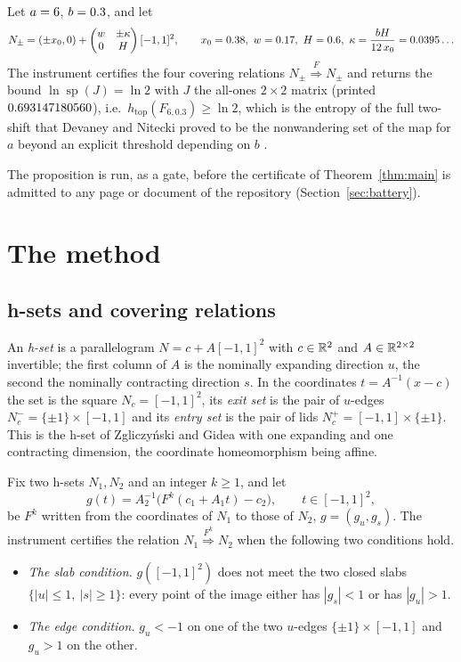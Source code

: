 \documentclass[11pt]{article}
\newcommand{\htop}{h_{\mathrm{top}}}
\newcommand{\sprad}{\operatorname{sp}}
\newcommand{\cover}[1]{\stackrel{#1}{\Longrightarrow}}
\begin{document}
\begin{proposition}[calibration]\label{prop:cal}
Let $a=6$, $b=0.3$, and let
\[
N_\pm=(\pm x_0,0)+\begin{pmatrix} w&\pm\kappa\\ 0&H\end{pmatrix}[-1,1]^2,\qquad
x_0=\CalX,\ w=\CalW,\ H=\CalH,\ \kappa=\frac{bH}{\CalKappaDen\,x_0}=\CalKappa\ldots
\]
The instrument certifies the four covering relations $N_\pm\cover{F}N_\pm$ and returns the bound
$\ln\sprad(J)=\ln2$ with $J$ the all-ones $2\times2$ matrix (printed $0.693147180560$), i.e.\ $\htop(F_{6,0.3})\ge\ln 2$,
which is the entropy of the full two-shift that Devaney and Nitecki proved to be the nonwandering set of the map
for $a$ beyond an explicit threshold depending on $b$ \cite{DN79}.
\end{proposition}

The proposition is run, as a gate, before the certificate of Theorem~\ref{thm:main} is admitted to any page or
document of the repository (Section~\ref{sec:battery}).

\section{The method}\label{sec:method}

\subsection{h-sets and covering relations}

An \emph{h-set} is a parallelogram $N=c+A[-1,1]^2$ with $c\in\mathbb{R}^2$ and $A\in\mathbb{R}^{2\times2}$ invertible; the first
column of $A$ is the nominally expanding direction $u$, the second the nominally contracting direction $s$. In the
coordinates $t=A^{-1}(x-c)$ the set is the square $N_c=[-1,1]^2$, its \emph{exit set} is the pair of
$u$-edges $N_c^-=\{\pm1\}\times[-1,1]$ and its \emph{entry set} is the pair of lids $N_c^+=[-1,1]\times\{\pm1\}$.
This is the h-set of Zgliczy\'nski and Gidea \cite{ZG04} with one expanding and one contracting dimension, the
coordinate homeomorphism being affine.

Fix two h-sets $N_1,N_2$ and an integer $k\ge1$, and let
\[
g(t)=A_2^{-1}\bigl(F^k(c_1+A_1t)-c_2\bigr),\qquad t\in[-1,1]^2,
\]
be $F^k$ written from the coordinates of $N_1$ to those of $N_2$, $g=(g_u,g_s)$. The instrument certifies the
relation $N_1\cover{F^k}N_2$ when the following two conditions hold.
\begin{itemize}
\item[(A)] \emph{The slab condition.} $g([-1,1]^2)$ does not meet the two closed slabs $\{|u|\le1,\ |s|\ge1\}$:
every point of the image either has $|g_s|<1$ or has $|g_u|>1$.
\item[(B)] \emph{The edge condition.} $g_u<-1$ on one of the two $u$-edges $\{\pm1\}\times[-1,1]$ and $g_u>1$ on
the other.
\end{itemize}
\end{document}
